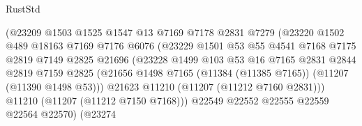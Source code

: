 \begin{lexlean}{RustStd}
\begin{coremodule}
                                  (@23209
                                    @1503
                                    @1525
                                    @1547
                                    @13
                                    @7169
                                    @7178
                                    @2831
                                    @7279
                                    (@23220
                                      @1502
                                      @489
                                      @18163
                                      @7169
                                      @7176
                                      @6076
                                      (@23229
                                        @1501
                                        @53
                                        @55
                                        @4541
                                        @7168
                                        @7175
                                        @2819
                                        @7149
                                        @2825
                                        @21696
                                        (@23228
                                          @1499
                                          @103
                                          @53
                                          @16
                                          @7165
                                          @2831
                                          @2844
                                          @2819
                                          @7159
                                          @2825
                                          (@21656
                                            @1498
                                            @7165
                                            (@11384 (@11385 @7165))
                                            (@11207 (@11390 @1498 @53)))
                                          @21623
                                          @11210
                                          (@11207 (@11212 @7160 @2831)))
                                        @11210
                                        (@11207 (@11212 @7150 @7168)))
                                      @22549
                                      @22552
                                      @22555
                                      @22559
                                      @22564
                                      @22570)
                                    (@23274

\end{coremodule}
\end{lexlean}
